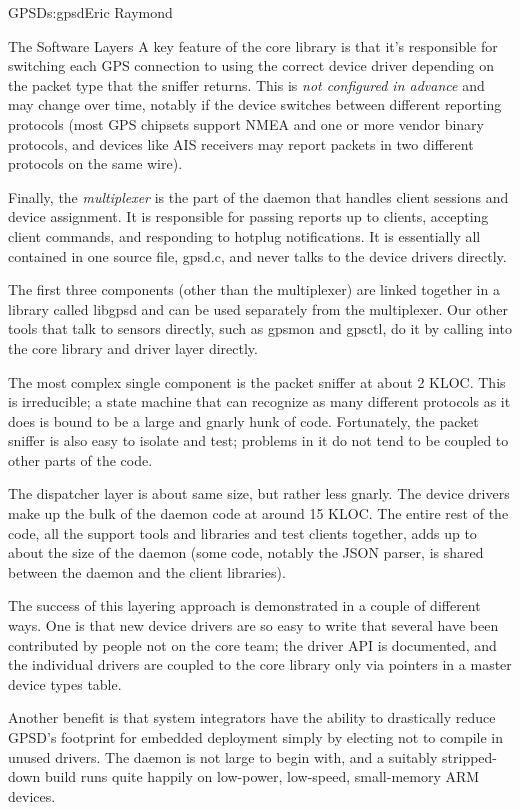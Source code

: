 \begin{aosachapter}{GPSD}{s:gpsd}{Eric Raymond}
\begin{aosasect1}{The Software Layers}
A key feature of the core library is that it's responsible for
switching each GPS connection to using the correct device driver
depending on the packet type that the sniffer returns.  This is \emph{not
configured in advance} and may change over time, notably if the device
switches between different reporting protocols (most GPS chipsets
support NMEA and one or more vendor binary protocols, and devices like
AIS receivers may report packets in two different protocols on the
same wire).

Finally, the \emph{multiplexer} is the part of the daemon that
handles client sessions and device assignment.  It is responsible
for passing reports up to clients, accepting client commands,
and responding to hotplug notifications. It is essentially all
contained in one source file, gpsd.c, and never talks to the device
drivers directly.

The first three components (other than the multiplexer) are linked
together in a library called libgpsd and can be used separately from
the multiplexer. Our other tools that talk to sensors directly, such as
gpsmon and gpsctl, do it by calling into the core library and driver
layer directly.

The most complex single component is the packet sniffer at about 2
KLOC.  This is irreducible; a state machine that can recognize as many
different protocols as it does is bound to be a large and gnarly hunk
of code.  Fortunately, the packet sniffer is also easy to isolate and
test; problems in it do not tend to be coupled to other parts of the
code.

The dispatcher layer is about same size, but rather less gnarly.  The
device drivers make up the bulk of the daemon code at around 15 KLOC.
The entire rest of the code, all the support tools and libraries and
test clients together, adds up to about the size of the daemon (some
code, notably the JSON parser, is shared between the daemon and the
client libraries).

The success of this layering approach is demonstrated in a couple of
different ways.  One is that new device drivers are so easy to write
that several have been contributed by people not on the core team; the
driver API is documented, and the individual drivers are coupled to the core
library only via pointers in a master device types table.

Another benefit is that system integrators have the ability to
drastically reduce GPSD's footprint for embedded deployment simply by
electing not to compile in unused drivers.  The daemon is not large to
begin with, and a suitably stripped-down build runs quite happily on
low-power, low-speed, small-memory ARM devices.


\end{aosasect1}
\end{aosachapter}
